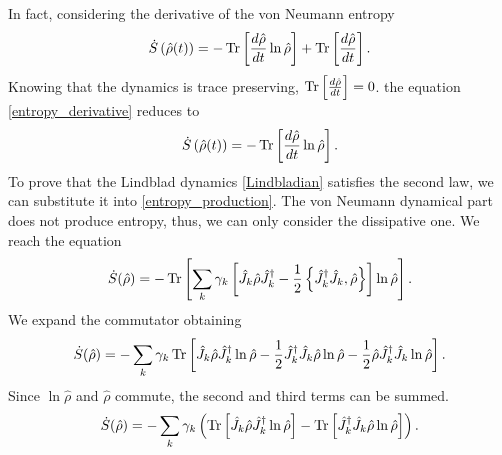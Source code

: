 In fact, considering the derivative of the von Neumann entropy
\begin{equation}\label{entropy_derivative}
    \dot S\left(\hat\rho(t)\right) = -\operatorname{Tr}\left[\frac{d\hat\rho}{dt}\ln\hat\rho\right] + \operatorname{Tr}\left[\frac{d\hat\rho}{dt}\right].
\end{equation}
Knowing that the dynamics is trace preserving, $\operatorname{Tr}\left[\frac{d\hat\rho}{dt}\right] = 0$. the equation \eqref{entropy_derivative} reduces to
\begin{equation}\label{entropy_production}
    \dot S\left(\hat\rho(t)\right) = -\operatorname{Tr}\left[\frac{d\hat\rho}{dt}\ln\hat\rho\right] .
\end{equation} 
To prove that the Lindblad dynamics \eqref{Lindbladian} satisfies the second law, we can substitute it into \eqref{entropy_production}. The von Neumann dynamical part does not produce entropy, thus, we can only consider the dissipative one. We reach the equation
\begin{equation}
    \dot S(\hat\rho) = -\operatorname{Tr}\left[\sum_{k}\gamma_{k}\left[\hat J_{k} \hat\rho\hat J_{k}^\dagger -\frac{1}{2} \left\{ \hat J_{k}^\dagger \hat J_{k}, \hat\rho\right\}\right]\ln\hat\rho\right].
\end{equation}
We expand the commutator obtaining
\begin{equation}
    \dot S(\hat\rho) =-\sum_{k}\gamma_{k}\operatorname{Tr}\left[\hat J_{k} \hat\rho\hat J_{k}^\dagger\ln\hat\rho -\frac{1}{2}\hat J_{k}^\dagger \hat J_{k}\hat\rho \ln\hat\rho-\frac{1}{2} \hat\rho\hat J_{k}^\dagger \hat J_{k}\ln\hat\rho\right].\\
\end{equation}     
Since $\ln\hat\rho$ and $\hat\rho$ commute, the second and third terms can be summed.
\begin{equation}\label{Lindbladian_entropy_production}
    \dot S(\hat\rho) =  -\sum_{k}\gamma_{k}\left(\operatorname{Tr}\left[\hat J_{k} \hat\rho\hat J_{k}^\dagger\ln\hat\rho\right]-\operatorname{Tr}\left[\hat J_{k}^\dagger \hat J_{k}\hat\rho\ln\hat\rho\right]\right).
\end{equation}
